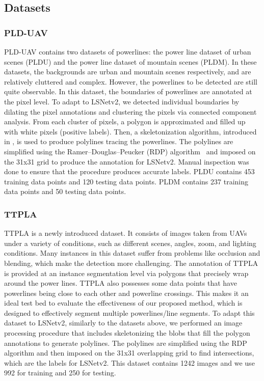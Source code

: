 \documentclass[journal]{IEEEtran}
\newcommand{\commentM}[1]{\textbf{\textcolor{blue}{M: #1}}}
\begin{document}
\subsection{Datasets}

\subsubsection{PLD-UAV}

PLD-UAV \cite{PLD_UAV} contains two datasets of powerlines: the power line dataset of urban scenes (PLDU) and the power line dataset of mountain scenes (PLDM). In these datasets, the backgrounds are urban and mountain scenes respectively, and are relatively cluttered and complex. However, the powerlines to be detected are still quite observable. In this dataset, the boundaries of powerlines are annotated at the pixel level. To adapt to LSNetv2, we detected individual boundaries by dilating the pixel annotations and clustering the pixels via connected component analysis. From each cluster of pixels, a polygon is approximated and filled up with white pixels (positive labels). Then, a skeletonization algorithm, introduced in \cite{skeleton}, is used to produce polylines tracing the powerlines. The polylines are simplified using the Ramer–Douglas–Peucker (RDP) algorithm~\cite{RDP} and imposed on the 31x31 grid to produce the annotation for LSNetv2. Manual inspection was done to ensure that the procedure produces accurate labels. PLDU contains 453 training data points and 120 testing data points. PLDM contains 237 training data points and 50 testing data points.

\subsubsection{TTPLA}

TTPLA \cite{TTPLA} is a newly introduced dataset. It consists of images taken from UAVs under a variety of conditions, such as different scenes, angles, zoom, and lighting conditions. Many instances in this dataset suffer from problems like occlusion and blending, which make the detection more challenging. The annotation of TTPLA is provided at an instance segmentation level via polygons that precisely wrap around the power lines. TTPLA also possesses some data points that have powerlines being close to each other and powerline crossings. This makes it an ideal test bed to evaluate the effectiveness of our proposed method, which is designed to effectively segment multiple powerlines/line segments. To adapt this dataset to LSNetv2, similarly to the datasets above, we performed an image processing procedure that includes skeletonizing the blobs that fill the polygon annotations to generate polylines. The polylines are simplified using the RDP algorithm and then imposed on the 31x31 overlapping grid to find intersections, which are the labels for LSNetv2. This dataset contains 1242 images and we use 992 for training and 250 for testing.
\end{document}
